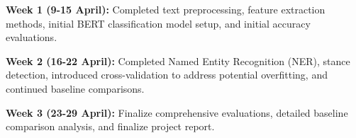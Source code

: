 \documentclass[11pt,a4paper]{article}
\begin{document}
\textbf{Week 1 (9-15 April):} Completed text preprocessing, feature extraction methods, initial BERT classification model setup, and initial accuracy evaluations.

\textbf{Week 2 (16-22 April):} Completed Named Entity Recognition (NER), stance detection, introduced cross-validation to address potential overfitting, and continued baseline comparisons.

\textbf{Week 3 (23-29 April):} Finalize comprehensive evaluations, detailed baseline comparison analysis, and finalize project report.







\end{document}
